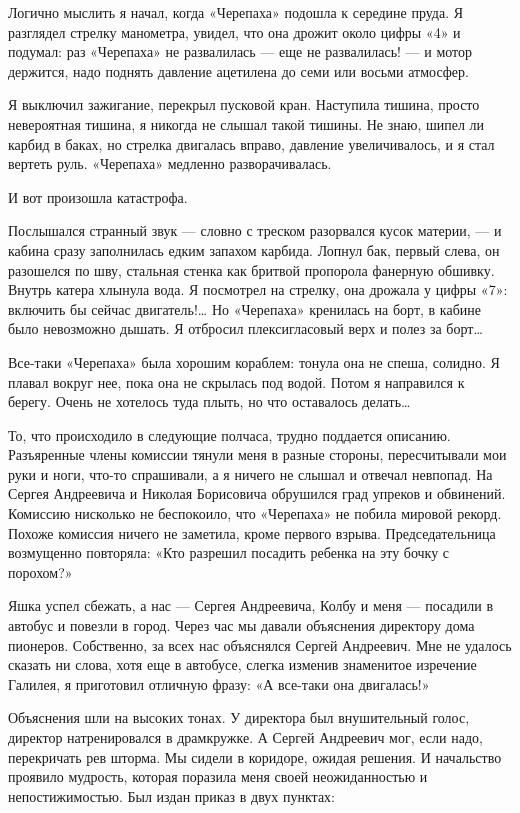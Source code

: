 Логично мыслить  я начал,  когда «Черепаха»  подошла к  середине пруда.  Я
разглядел стрелку  манометра, увидел,  что она  дрожит около  цифры «4»  и
подумал: раз «Черепаха»  не развалилась —  еще не развалилась!  — и  мотор
держится, надо поднять давление ацетилена до семи или восьми атмосфер.

Я выключил  зажигание, перекрыл  пусковой кран.  Наступила тишина,  просто
невероятная тишина, я никогда  не слышал такой тишины.  Не знаю, шипел  ли
карбид в баках, но стрелка  двигалась вправо, давление увеличивалось, и  я
стал вертеть руль. «Черепаха» медленно разворачивалась.

И вот произошла катастрофа.

Послышался странный звук — словно с  треском разорвался кусок материи, —  и
кабина сразу заполнилась едким запахом карбида. Лопнул бак, первый  слева,
он разошелся  по  шву,  стальная стенка  как  бритвой  пропорола  фанерную
обшивку. Внутрь катера хлынула вода. Я посмотрел на стрелку, она дрожала у
цифры «7»: включить бы сейчас двигатель!… Но «Черепаха» кренилась на борт,
в кабине было невозможно дышать. Я отбросил плексигласовый верх и полез за
борт…

Все-таки «Черепаха» была хорошим кораблем: тонула она не спеша, солидно. Я
плавал вокруг нее, пока  она не скрылась под  водой. Потом я направился  к
берегу. Очень не хотелось туда плыть, но что оставалось делать…

То, что  происходило  в  следующие  полчаса,  трудно  поддается  описанию.
Разъяренные члены комиссии тянули меня в разные стороны, пересчитывали мои
руки и ноги, что-то спрашивали, а  я ничего не слышал и отвечал  невпопад.
На  Сергея  Андреевича  и  Николая  Борисовича  обрушился  град  упреков  и
обвинений. Комиссию  нисколько не  беспокоило,  что «Черепаха»  не  побила
мировой рекорд. Похоже комиссия ничего не заметила, кроме первого  взрыва.
Председательница возмущенно повторяла: «Кто  разрешил посадить ребенка  на
эту бочку с порохом?»

Яшка успел сбежать, а нас — Сергея  Андреевича, Колбу и меня — посадили  в
автобус и повезли в город. Через  час мы давали объяснения директору  дома
пионеров. Собственно,  за  всех нас  объяснялся  Сергей Андреевич.  Мне  не
удалось сказать ни слова, хотя  еще в автобусе, слегка изменив  знаменитое
изречение  Галилея,  я   приготовил  отличную  фразу:   «А  все-таки   она
двигалась!»

Объяснения шли  на  высоких тонах.  У  директора был  внушительный  голос,
директор натренировался в драмкружке. А  Сергей Андреевич мог, если  надо,
перекричать рев шторма. Мы сидели в коридоре, ожидая решения. И начальство
проявило  мудрость,   которая  поразила   меня  своей   неожиданностью   и
непостижимостью. Был издан приказ в двух пунктах:

